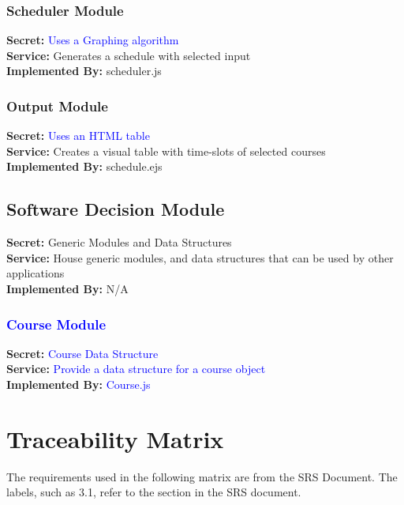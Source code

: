 \documentclass[11pt, oneside]{article}
\begin{document}
\subsubsection{Scheduler Module}
\textbf{Secret:} \textcolor{blue}{Uses a Graphing algorithm} \\
\textbf{Service:} Generates a schedule with selected input \\
\textbf{Implemented By:} scheduler.js \\

\subsubsection{Output Module}
\textbf{Secret:} \textcolor{blue}{Uses an HTML table} \\
\textbf{Service:} Creates a visual table with time-slots of selected courses \\
\textbf{Implemented By:} schedule.ejs \\

\subsection{Software Decision Module}
\textbf{Secret:} Generic Modules and Data Structures\\
\textbf{Service:} House generic modules, and data structures that can be used by other applications \\
\textbf{Implemented By:} N/A \\

\subsubsection{\textcolor{blue}{Course Module}}
\textbf{Secret:} \textcolor{blue}{Course Data Structure} \\
\textbf{Service:} \textcolor{blue}{Provide a data structure for a course object} \\
\textbf{Implemented By: } \textcolor{blue}{ Course.js} \\


\newpage



\section{Traceability Matrix}
The requirements used in the following matrix are from the SRS Document. The labels, such as 3.1, refer to the section in the SRS document.
\end{document}
